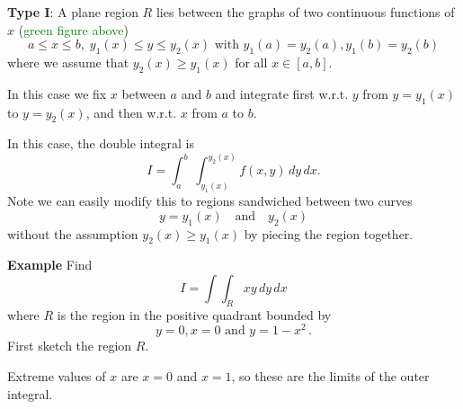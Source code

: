 \documentclass{article}
\begin{document}
\textbf{Type I}:  A plane region $R$ lies between the graphs of two
continuous functions of $x$ (\textcolor{green}{green figure above})
$$ 
a \le x \le b,\;  y_1(x) \le y \le y_2(x) \mbox{  with  } y_1(a) = y_2 (a), y_1(b) = y_2(b) 
$$
where we assume that $y_2 (x) \geq y_1 (x)$ for all $x \in [a, b]$.

In this case we fix $x$ between $a$ and $b$ and integrate first w.r.t. $y$
from $y = y_1 (x)$ to $y = y_2 (x)$, and then w.r.t. $x$ from $a$ to $b$.

In this case, the double integral is
$$ 
I= \int_a^b \, \int_{y_1(x)}^{y_2(x)} f(x,y) \, dy \, dx. 
$$
Note we can easily modify this to regions sandwiched between two curves
$$
y = y_1 (x) \quad \mbox{and} \quad y_2 (x)
$$
without the assumption $y_2 (x) \geq y_1 (x)$ by piecing the region together.

%
%
%
%
%
%
%


\textbf{Example} Find
$$  
I = \int \int_R xy \, dy \, dx 
$$
where $R$ is the region in the positive quadrant bounded by 
$$
y=0, x=0 \mbox{  and   } y=1-x^2\,.
$$
First sketch the region $R$.

\vskip 5cm


Extreme values of $x$ are $x=0$ and $x=1$, so these
are the limits of the outer integral. 
\end{document}
